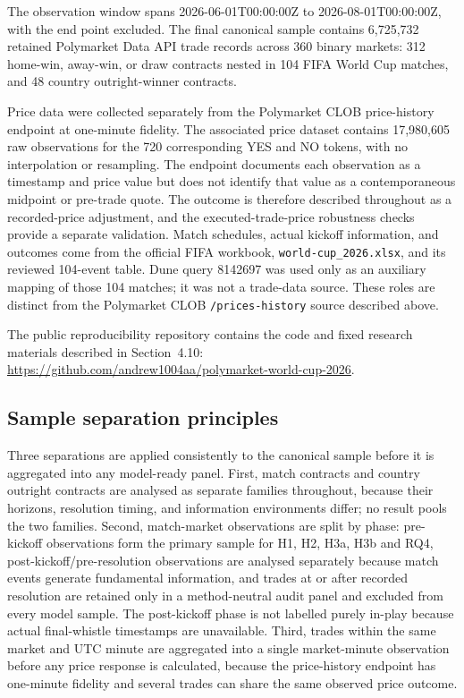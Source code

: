 The observation window spans 2026-06-01T00:00:00Z to
2026-08-01T00:00:00Z, with the end point excluded. The final canonical sample
contains 6,725,732 retained Polymarket Data API trade records across 360 binary markets:
312 home-win, away-win, or draw contracts nested in 104 FIFA World Cup matches,
and 48 country outright-winner contracts.

Price data were collected separately from the Polymarket CLOB price-history
endpoint at one-minute fidelity. The associated price dataset contains
17,980,605 raw observations for the 720 corresponding YES and NO tokens, with
no interpolation or resampling. The endpoint documents each observation as a
timestamp and price value but does not identify that value as a contemporaneous
midpoint or pre-trade quote. The outcome is therefore described throughout as
a recorded-price adjustment, and the executed-trade-price robustness checks
provide a separate validation. Match schedules, actual kickoff information,
and outcomes come from the official FIFA workbook,
\texttt{world-cup\_2026.xlsx}, and its reviewed 104-event table. Dune query
8142697 was used only as an auxiliary mapping of those 104 matches; it was not
a trade-data source. These roles are distinct from the Polymarket CLOB
\texttt{/prices-history} source described above.

The public reproducibility repository contains the code and fixed research
materials described in Section~4.10:
\url{https://github.com/andrew1004aa/polymarket-world-cup-2026}.

\subsection{Sample separation principles}

Three separations are applied consistently to the canonical sample before it
is aggregated into any model-ready panel. First, match contracts and country
outright contracts are analysed as separate families throughout, because
their horizons, resolution timing, and information environments differ; no
result pools the two families. Second, match-market observations are split
by phase: pre-kickoff observations form the primary sample for H1, H2, H3a, H3b and RQ4,
post-kickoff/pre-resolution observations are analysed separately because
match events generate fundamental information, and trades at or after
recorded resolution are retained only in a method-neutral audit panel and
excluded from every model sample. The post-kickoff phase is not labelled
purely in-play because actual final-whistle timestamps are unavailable.
Third, trades within the same market and UTC minute are aggregated into a
single market-minute observation before any price response is calculated,
because the price-history endpoint has one-minute fidelity and several
trades can share the same observed price outcome.

